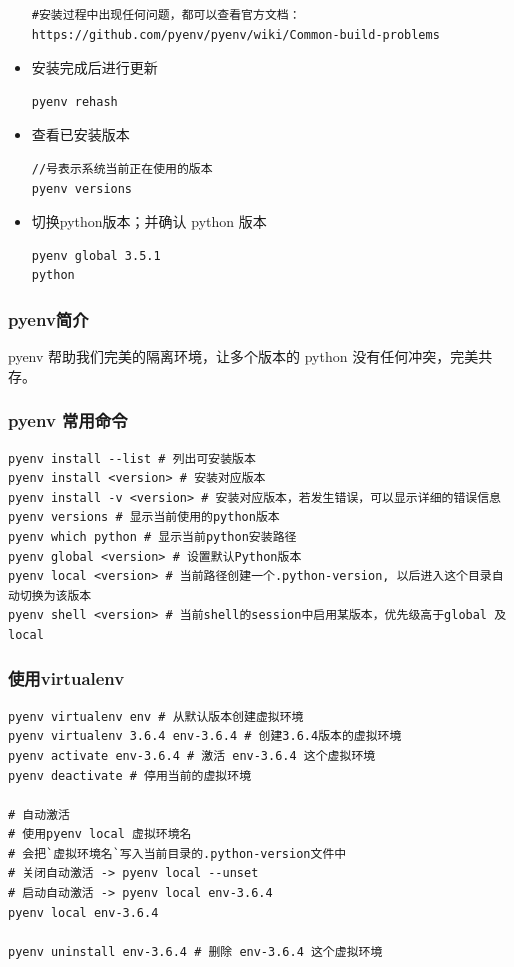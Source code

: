 \documentclass[12pt]{article}
\begin{document}
\begin{itemize}
\begin{lstlisting}
#安装过程中出现任何问题，都可以查看官方文档：https://github.com/pyenv/pyenv/wiki/Common-build-problems
\end{lstlisting}

    \item 安装完成后进行更新
\begin{lstlisting}
pyenv rehash
\end{lstlisting}
    
    \item 查看已安装版本

\begin{lstlisting}
//号表示系统当前正在使用的版本
pyenv versions
\end{lstlisting}
    
    \item 切换python版本；并确认 python 版本
    
\begin{lstlisting}
pyenv global 3.5.1
python
\end{lstlisting}
\end{itemize}

\subsubsection{pyenv简介}
pyenv 帮助我们完美的隔离环境，让多个版本的 python 没有任何冲突，完美共存。

\subsubsection{pyenv 常用命令}

\begin{lstlisting}
pyenv install --list # 列出可安装版本
pyenv install <version> # 安装对应版本
pyenv install -v <version> # 安装对应版本，若发生错误，可以显示详细的错误信息
pyenv versions # 显示当前使用的python版本
pyenv which python # 显示当前python安装路径
pyenv global <version> # 设置默认Python版本
pyenv local <version> # 当前路径创建一个.python-version, 以后进入这个目录自动切换为该版本
pyenv shell <version> # 当前shell的session中启用某版本，优先级高于global 及 local
\end{lstlisting}

\subsubsection{使用virtualenv}

\begin{lstlisting}
pyenv virtualenv env # 从默认版本创建虚拟环境
pyenv virtualenv 3.6.4 env-3.6.4 # 创建3.6.4版本的虚拟环境
pyenv activate env-3.6.4 # 激活 env-3.6.4 这个虚拟环境
pyenv deactivate # 停用当前的虚拟环境

# 自动激活
# 使用pyenv local 虚拟环境名
# 会把`虚拟环境名`写入当前目录的.python-version文件中
# 关闭自动激活 -> pyenv local --unset
# 启动自动激活 -> pyenv local env-3.6.4
pyenv local env-3.6.4

pyenv uninstall env-3.6.4 # 删除 env-3.6.4 这个虚拟环境
\end{lstlisting}
\end{document}

